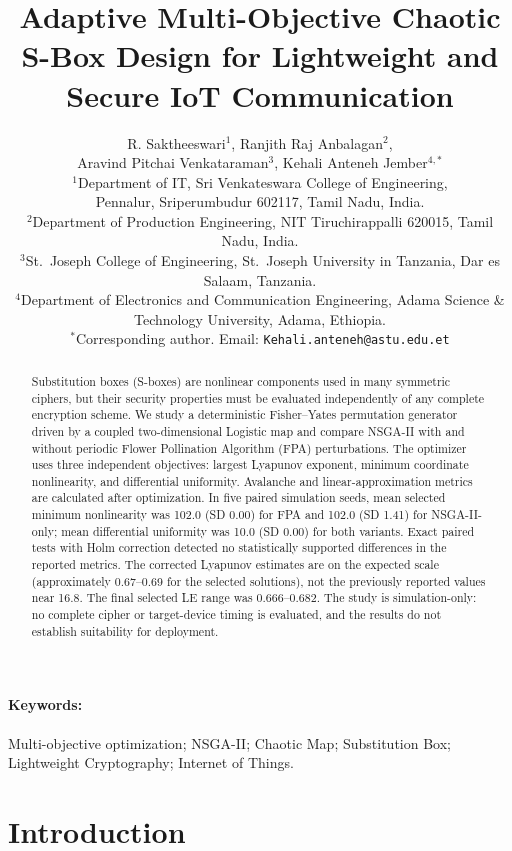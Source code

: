 \documentclass[11pt,a4paper]{article}
\title{\normalsize Adaptive Multi-Objective Chaotic S-Box Design for Lightweight and Secure IoT Communication}
\author{
R. Saktheeswari$^{1}$, Ranjith Raj Anbalagan$^{2}$,\\
Aravind Pitchai Venkataraman$^{3}$, Kehali Anteneh Jember$^{4,\ast}$\\[0.4em]
\small $^{1}$Department of IT, Sri Venkateswara College of Engineering,\\Pennalur, Sriperumbudur 602117, Tamil Nadu, India.\\
\small $^{2}$Department of Production Engineering, NIT Tiruchirappalli 620015, Tamil Nadu, India.\\
\small $^{3}$St.\ Joseph College of Engineering, St.\ Joseph University in Tanzania, Dar es Salaam, Tanzania.\\
\small $^{4}$Department of Electronics and Communication Engineering, Adama Science \& Technology University, Adama, Ethiopia.\\
\small $^\ast$Corresponding author. Email: \texttt{Kehali.anteneh@astu.edu.et}
}
\date{}
\begin{document}
\maketitle

\begin{abstract}
Substitution boxes (S-boxes) are nonlinear components used in many
symmetric ciphers, but their security properties must be evaluated
independently of any complete encryption scheme. We study a deterministic
Fisher--Yates permutation generator driven by a coupled two-dimensional
Logistic map and compare NSGA-II with and without periodic Flower
Pollination Algorithm (FPA) perturbations. The optimizer uses three
independent objectives: largest Lyapunov exponent, minimum coordinate
nonlinearity, and differential uniformity. Avalanche and linear-approximation
metrics are calculated after optimization. In five paired simulation
seeds, mean selected minimum nonlinearity was 102.0 (SD 0.00) for FPA
and 102.0 (SD 1.41) for NSGA-II-only; mean differential uniformity was
10.0 (SD 0.00) for both variants. Exact paired tests
with Holm correction detected no statistically supported differences
in the reported metrics. The corrected Lyapunov estimates are on the expected scale
(approximately 0.67--0.69 for the selected solutions), not the previously
reported values near 16.8. The final selected LE range was
0.666--0.682. The study is simulation-only: no complete
cipher or target-device timing is evaluated, and the results do not
establish suitability for deployment.

\end{abstract}

\paragraph*{Keywords:}
Multi-objective optimization; NSGA-II; Chaotic Map; Substitution Box;
Lightweight Cryptography; Internet of Things.

\section{Introduction}
\label{sec:intro}
\end{document}
